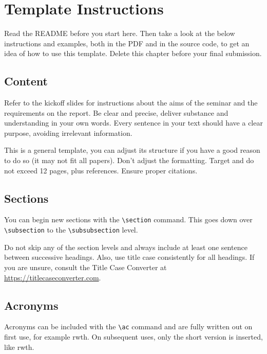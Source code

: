 
\setcounter{section}{-1}

\section{Template Instructions}
\label{ch:template-instructions}

Read the README before you start here. Then take a look at the below instructions and examples, both in the PDF and in the source code, to get an idea of how to use this template. Delete this chapter before your final submission.

\subsection{Content}
\label{sec:content}

Refer to the kickoff slides for instructions about the aims of the seminar and the requirements on the report. Be clear and precise, deliver substance and understanding in your own words. Every sentence in your text should have a clear purpose, avoiding irrelevant information.

This is a general template, you can adjust its structure if you have a good reason to do so (it may not fit all papers). Don't adjust the formatting. Target and do not exceed 12 pages, plus references. Ensure proper citations.

\subsection{Sections}
\label{sec:sections}

You can begin new sections with the \texttt{\textbackslash section} command. This goes down over \texttt{\textbackslash subsection} to the \texttt{\textbackslash subsubsection} level.

Do not skip any of the section levels and always include at least one sentence between successive headings. Also, use title case consistently for all headings. If you are unsure, consult the Title Case Converter at \url{https://titlecaseconverter.com}.

\subsection{Acronyms}
\label{sec:acronyms}

Acronyms can be included with the \texttt{\textbackslash ac} command and are fully written out on first use, for example \ac{rwth}. On subsequent uses, only the short version is inserted, like \ac{rwth}.

